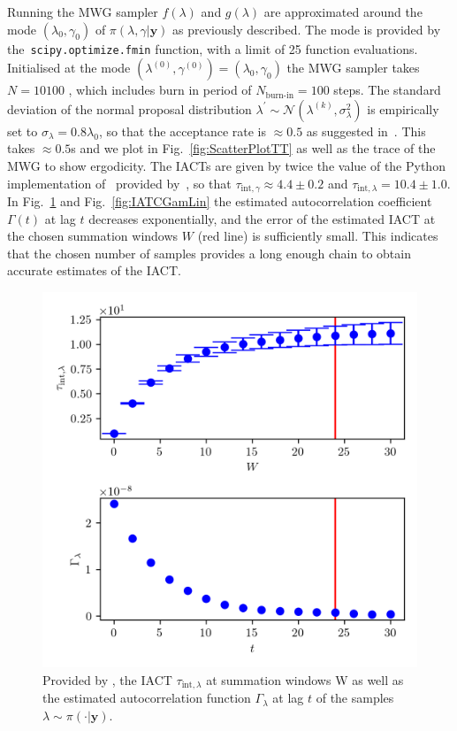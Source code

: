 Running the MWG sampler $f(\lambda)$ and $g(\lambda)$ are approximated around the mode $( \lambda_{0}, \gamma_0 )$ of $\pi(\lambda,\gamma| \bm{y})$ as previously described. 
The mode is provided by \linebreak the~\texttt{scipy.optimize.fmin} function, with a limit of 25 function evaluations.
Initialised at the mode $(\lambda^{(0)} , \gamma^{(0)}  ) = ( \lambda_{0} , \gamma_{0}  )$ the MWG sampler takes $N = 10100$ , which includes burn in period of $N_{\text{burn-in}} = 100$ steps.
The standard deviation of the normal proposal distribution $\lambda^{\prime} \sim \mathcal{N}(\lambda^{(k)} , \sigma^2_{\lambda})$ is empirically set to $\sigma_{\lambda} = 0.8 \lambda_0$, so that the acceptance rate is $\approx 0.5$ as suggested in~\cite{robertsLecNot}.
This takes  $\approx 0.5$s and we plot in Fig.~\ref{fig:ScatterPlotTT} as well as the trace of the MWG to show ergodicity.
The IACTs are given by twice the value of the Python implementation of~\cite{wolff2004monte} provided by~\cite{drikHesse}, so that $\tau_{\text{int}, \gamma} \approx 4.4 \pm 0.2$ and $\tau_{\text{int}, \lambda} = 10.4 \pm 1.0 $.
In Fig.~\ref{fig:IATCLamLin} and Fig.~\ref{fig:IATCGamLin} the estimated autocorrelation coefficient $\Gamma(t)$ at lag $t$ decreases exponentially, and the error of the estimated IACT at the chosen summation windows $W$ (red line) is sufficiently small.
This indicates that the chosen number of samples provides a long enough chain to obtain accurate estimates of the IACT.
\begin{figure}[ht!]
	\centering
	\includegraphics{UwerrTauIntFirstO3lam.png}
	\caption[IACT of $\lambda \sim \pi( \cdot| \bm{y})$, for linear model.]{Provided by \cite{drikHesse}, the IACT $\tau_{\text{int},\lambda}$ at summation windows W as well as the estimated autocorrelation function $\Gamma_{\lambda}$ at lag $t$ of the samples $\lambda \sim \pi( \cdot| \bm{y})$.}
	\label{fig:IATCLamLin}
\end{figure} 

